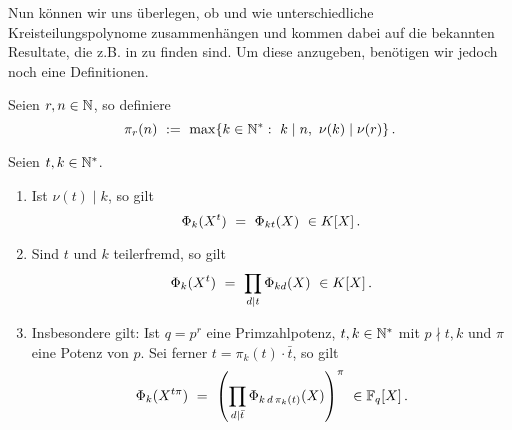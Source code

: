 Nun können wir uns überlegen, ob und wie unterschiedliche Kreisteilungspolynome
zusammenhängen und kommen dabei auf die bekannten Resultate, die z.B. in 
\autocite[Proposition 10.6, 10.7]{hachenberger1997finite} zu finden sind. Um
diese anzugeben, benötigen wir jedoch noch eine Definitionen.

\begin{definition}
  Seien $r,n\in \mathbb{N}$, so definiere
  \[ \pi_r(n) \ :=\  \max\{k \in \mathbb{N}^\ast:\ k \mid n,\ \nu(k) \mid \nu(r)
  \}\,.\]
\end{definition}

\begin{satz}
  \label{satz:zusammenhang_unterschiedlicher_kreisteilungspolys}
  Seien $t,k \in \mathbb{N}^\ast$.
  \begin{enumerate}
    \item Ist $\nu(t) \mid k$, so gilt
      \[ \Phi_k(X^t) \speq= \Phi_{kt}(X) \ \in K[X]\,.\]
    \item Sind $t$ und $k$ teilerfremd, so gilt
      \[ \Phi_k(X^t) \ =\  \prod_{d\mid t} \Phi_{kd}(X)\ \in K[X]\,.\]
    \item Insbesondere gilt: Ist $q = p^r$ eine Primzahlpotenz,
      $t,k\in\mathbb{N}^\ast$ mit $p\nmid t,k$ und $\pi$ eine Potenz von $p$. Sei ferner
      $t = \pi_k(t)\cdot \bar t$, so gilt
      \[ \Phi_k(X^{t\pi}) \ =\  
        \left(\prod_{d\mid \bar t} \Phi_{k\,d\,\pi_k(t)} (X)\right)^\pi
        \ \in \mathbb{F}_q[X]\,. \]
  \end{enumerate}
\end{satz}
